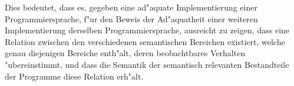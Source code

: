 \documentclass[12pt,a4paper]{article}
\begin{document}
Dies bedeutet, dass es, gegeben eine ad"aquate Implementierung einer Programmiersprache, f"ur den
Beweis der Ad"aquatheit einer weiteren Implementierung derselben Programmiersprache, ausreicht zu
zeigen, dass eine Relation zwischen den verschiedenen semantischen Bereichen existiert, welche
genau diejenigen Bereiche enth"alt, deren beobachtbares Verhalten "ubereinstimmt, und dass die
Semantik der semantisch relevanten Bestandteile der Programme diese Relation erh"alt.
\end{document}
